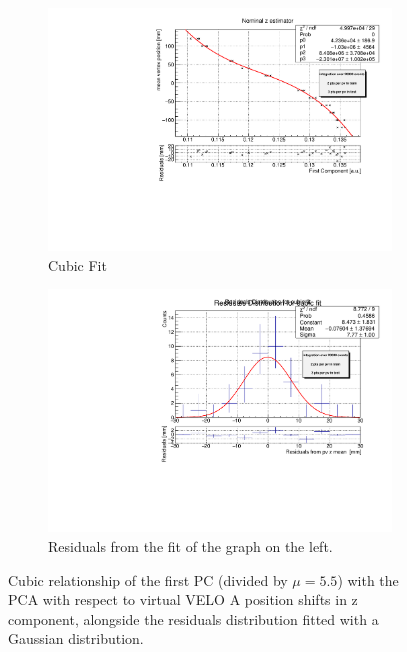 \begin{figure}
    \centering
    \begin{subfigure}{0.48\textwidth}
    \includegraphics[width=\linewidth]{figures/z_fit_veloA_normalised.pdf}
    \caption{Cubic Fit}\label{fig:z_veloA_fit_MC}
    \end{subfigure}
    \begin{subfigure}{0.48\textwidth}
    \includegraphics[width=\linewidth]{figures/z_res_veloA_normalised.pdf}
    \caption{Residuals from the fit of the graph on the left. }\label{fig:z_veloA_res_MC}
    \end{subfigure}
    \caption{Cubic relationship of the first PC (divided by $\mu=5.5$) with the PCA with respect to virtual VELO A position shifts in z component, alongside the residuals distribution fitted with a Gaussian distribution.}
    \label{fig:z_veloA_MC}
\end{figure}


